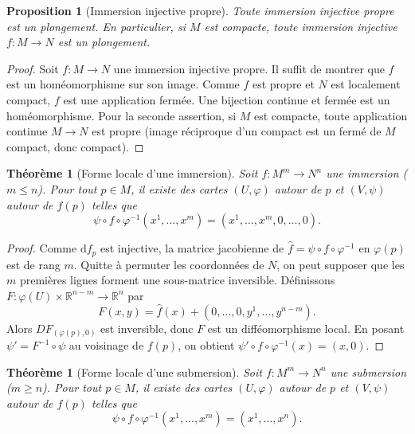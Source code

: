\documentclass[12pt,a4paper,openany]{book}
\theoremstyle{definition}
\theoremstyle{plain}
\newtheorem{theoreme}[definition]{Théorème}
\newtheorem{proposition}[definition]{Proposition}
\theoremstyle{remark}
\newcommand{\R}{\mathbb{R}}
\newcommand{\dd}{\mathrm{d}}
\begin{document}
\begin{proposition}[Immersion injective propre]\label{prop:immersion-propre}
Toute immersion injective propre est un plongement.
En particulier, si $M$ est compacte, toute immersion injective $f : M \to N$
est un plongement.
\end{proposition}

\begin{proof}
Soit $f : M \to N$ une immersion injective propre. Il suffit de montrer que
$f$ est un homéomorphisme sur son image. Comme $f$ est propre et $N$ est localement
compact, $f$ est une application fermée. Une bijection continue et fermée
est un homéomorphisme. Pour la seconde assertion, si $M$ est compacte, toute
application continue $M \to N$ est propre (image réciproque d'un compact est un
fermé de $M$ compact, donc compact).
\end{proof}

\begin{theoreme}[Forme locale d'une immersion]\label{thm:forme-locale-immersion}
Soit $f : M^m \to N^n$ une immersion ($m \leqslant n$). Pour tout $p \in M$,
il existe des cartes $(U, \varphi)$ autour de $p$ et $(V, \psi)$ autour de $f(p)$
telles que
\[
  \psi \circ f \circ \varphi^{-1}(x^1, \ldots, x^m) = (x^1, \ldots, x^m, 0, \ldots, 0).
\]
\end{theoreme}

\begin{proof}
Comme $\dd f_p$ est injective, la matrice jacobienne de $\hat{f} = \psi \circ f \circ \varphi^{-1}$
en $\varphi(p)$ est de rang $m$. Quitte à permuter les coordonnées de $N$, on peut
supposer que les $m$ premières lignes forment une sous-matrice inversible.
Définissons $F : \varphi(U) \times \R^{n-m} \to \R^n$ par
\[
  F(x, y) = \hat{f}(x) + (0, \ldots, 0, y^1, \ldots, y^{n-m}).
\]
Alors $DF_{(\varphi(p), 0)}$ est inversible, donc $F$ est un difféomorphisme local.
En posant $\psi' = F^{-1} \circ \psi$ au voisinage de $f(p)$, on obtient
$\psi' \circ f \circ \varphi^{-1}(x) = (x, 0)$.
\end{proof}

\begin{theoreme}[Forme locale d'une submersion]\label{thm:forme-locale-submersion}
Soit $f : M^m \to N^n$ une submersion ($m \geqslant n$). Pour tout $p \in M$,
il existe des cartes $(U, \varphi)$ autour de $p$ et $(V, \psi)$ autour de $f(p)$
telles que
\[
  \psi \circ f \circ \varphi^{-1}(x^1, \ldots, x^m) = (x^1, \ldots, x^n).
\]
\end{theoreme}
\end{document}
